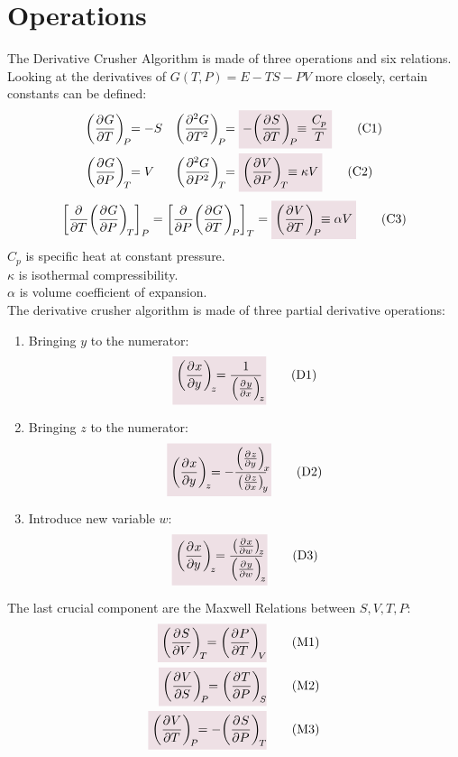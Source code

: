 \documentclass{article}
\begin{document}
\section*{Operations}
    The Derivative Crusher Algorithm is made of three operations and six relations. 
    Looking at the derivatives of $G(T,P)=E-TS-PV$ more closely, certain constants can be defined: 
    \begin{align*}
        \pder{G}{T}[P]&=-S & \pder[2]{G}{T}[P]&=\coloredanswer{-\pder{S}{T}[P]\equiv\frac{C_p}{T}}\tag{C1}\label{C1}
        \\
        \pder{G}{P}[T]&=V & \pder[2]{G}{P}[T]&=\coloredanswer{\pder{V}{P}[T]\equiv\kappa V}\tag{C2}\label{C2}
    \end{align*}
    \begin{equation*}
        \qty[\pder{T}\pder{G}{P}[T]~]_{P}=\qty[\pder{P}\pder{G}{T}[P]~]_{T}=\coloredanswer{\pder{V}{T}[P]\equiv\alpha V}\tag{C3}\label{C3} %
    \end{equation*}
    $C_p$ is specific heat at constant pressure. 
    \\
    $\kappa$ is isothermal compressibility.
    \\
    $\alpha$ is volume coefficient of expansion.
    \\
    The derivative crusher algorithm is made of three partial derivative operations:
    \begin{enumerate}
        \item Bringing $y$ to the numerator:
        \begin{equation*}
            \coloredanswer{\pder{x}{y}[z]=\oo{\pder{y}{x}[z]}}\tag{D1}\label{D1}
        \end{equation*}
        \item Bringing $z$ to the numerator:
        \begin{equation*}
            \coloredanswer{\pder{x}{y}[z]=-\frac{\pder{z}{y}[x]}{\pder{z}{x}[y]}}\tag{D2}\label{D2}
        \end{equation*}
        \item Introduce new variable $w$:
        \begin{equation*}
            \coloredanswer{\pder{x}{y}[z]=\frac{\pder{x}{w}[z]}{\pder{y}{w}[z]}}\tag{D3}\label{D3}
        \end{equation*}
    \end{enumerate}
    The last crucial component are the Maxwell Relations between $S,V,T,P$:
    \begin{align*}
        \coloredanswer{\pder{S}{V}[T]=\pder{P}{T}[V]}\tag{M1}\label{M1}
        \\
        \coloredanswer{\pder{V}{S}[P]=\pder{T}{P}[S]}\tag{M2}\label{M2}
        \\
        \coloredanswer{\pder{V}{T}[P]=-\pder{S}{P}[T]}\tag{M3}\label{M3}
    \end{align*}
    \newpage
\end{document}
